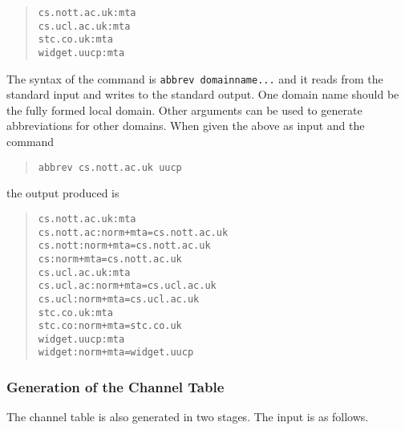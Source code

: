 \begin{quote}\small\begin{verbatim}
cs.nott.ac.uk:mta
cs.ucl.ac.uk:mta
stc.co.uk:mta
widget.uucp:mta
\end{verbatim}\end{quote}

The syntax of the  command is \verb|abbrev domainname...| and
it reads from the standard input and writes to the standard output.
One domain name should be the fully formed local domain.  Other arguments
can be used to generate abbreviations for other domains.   
When given the above as input and the command

\begin{quote}\small\begin{verbatim}
abbrev cs.nott.ac.uk uucp
\end{verbatim}\end{quote}

the output produced is 

\begin{quote}\small\begin{verbatim}
cs.nott.ac.uk:mta
cs.nott.ac:norm+mta=cs.nott.ac.uk
cs.nott:norm+mta=cs.nott.ac.uk
cs:norm+mta=cs.nott.ac.uk
cs.ucl.ac.uk:mta
cs.ucl.ac:norm+mta=cs.ucl.ac.uk
cs.ucl:norm+mta=cs.ucl.ac.uk
stc.co.uk:mta
stc.co:norm+mta=stc.co.uk
widget.uucp:mta
widget:norm+mta=widget.uucp
\end{verbatim}\end{quote}

\subsubsection	{Generation of the Channel Table}\label{tablebuild:channel}

The channel table is also generated in two stages.  The input is as follows.

